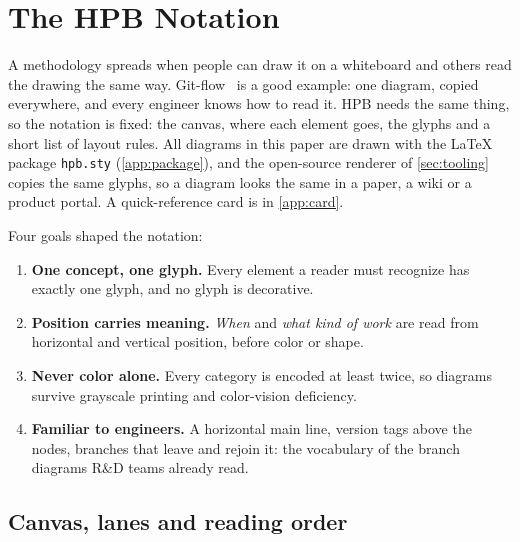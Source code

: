 \section{The HPB Notation}
\label{sec:notation}

A methodology spreads when people can draw it on a whiteboard and others
read the drawing the same way. Git-flow~\citep{driessen2010gitflow} is a
good example: one diagram, copied everywhere, and every engineer knows how
to read it. HPB needs the same thing, so the notation is fixed: the canvas,
where each element goes, the glyphs and a short list of layout rules. All
diagrams in this paper are drawn with the \LaTeX{} package
\texttt{hpb.sty} (\cref{app:package}), and the open-source renderer of
\cref{sec:tooling} copies the same glyphs, so a diagram looks the same in
a paper, a wiki or a product portal. A quick-reference card is in
\cref{app:card}.

Four goals shaped the notation:
\begin{enumerate}[label=\textbf{G\arabic*},leftmargin=*,itemsep=1pt,topsep=3pt]
  \item \textbf{One concept, one glyph.} Every element a reader must
        recognize has exactly one glyph, and no glyph is decorative.
  \item \textbf{Position carries meaning.} \emph{When} and \emph{what kind
        of work} are read from horizontal and vertical position, before
        color or shape.
  \item \textbf{Never color alone.} Every category is encoded at least
        twice, so diagrams survive grayscale printing and color-vision
        deficiency.
  \item \textbf{Familiar to engineers.} A horizontal main line, version tags
        above the nodes, branches that leave and rejoin it: the vocabulary
        of the branch diagrams R\&D teams already read.
\end{enumerate}

\subsection{Canvas, lanes and reading order}
\label{sec:notation-canvas}

